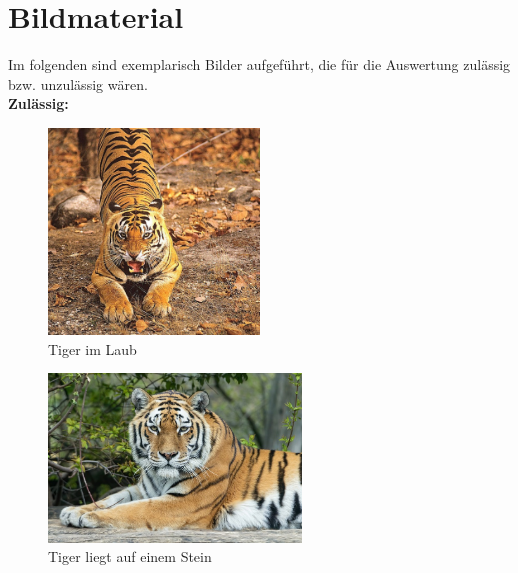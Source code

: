 \newpage


\section*{\LARGE\textbf{Bildmaterial}}

Im folgenden sind exemplarisch Bilder aufgeführt, die für die Auswertung zulässig bzw. unzulässig wären. \\

\textbf{Zulässig:}

\begin{figure}[htbp]
	\centering
		\includegraphics[width=0.50\textwidth]{BilderPDF/zielsetzung/tiger_01.jpg}
	\caption{Tiger im Laub \cite{tiger_laub}}
	\label{fig:tiger_01}
\end{figure}

\vspace{0.5cm}

\begin{figure}[htbp]
	\centering
		\includegraphics[width=0.60\textwidth]{BilderPDF/zielsetzung/tiger_02.jpg}
	\caption{Tiger liegt auf einem Stein \cite{tiger_stein}}
	\label{fig:tiger_02}
\end{figure}

\newpage

